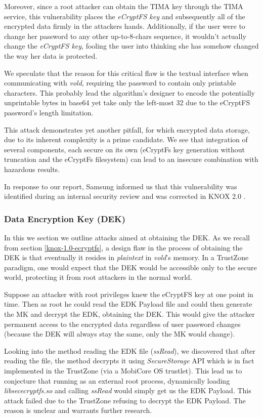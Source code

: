 \documentclass[11pt]{article}
\begin{document}
Moreover, since a root attacker can obtain the TIMA key through the TIMA service, this vulnerability places the \emph{eCryptFS key} and 
subsequently all of the encrypted data firmly in the attackers hands.
Additionally, if the user were to change her password to any other up-to-8-chars sequence, it wouldn't actually change the \emph{eCryptFS key}, 
fooling the user into thinking she has somehow changed the way her data is protected.

We speculate that the reason for this critical flaw is the textual interface when communicating with \emph{vold}, 
requiring the password to contain only printable characters. This probably lead the algorithm's designer to encode the potentially 
unprintable bytes in base64 yet take only the left-most 32 due to the eCryptFS password's length limitation.

This attack demonstrates yet another pitfall, for which encrypted data storage, due to its inherent complexity is a prime candidate. 
We see that integration of several components, each secure on its own (eCryptFs key generation without truncation and the eCryptFs filesystem) can lead 
to an insecure combination with hazardous results. 

In response to our report, Samsung informed us that this vulnerability was identified during an internal security review and was corrected in KNOX 2.0 \cite{SamsungCorrespondence}.

\subsubsection{Data Encryption Key (DEK)} \label{knox-1.0-dek-attack}
In this we section we outline attacks aimed at obtaining the DEK.
As we recall from section \ref{knox-1.0-ecryptfs}, a design flaw in the process of obtaining the DEK is that eventually it resides in \emph{plaintext} 
in \emph{vold}'s memory. In a TrustZone paradigm, one would expect that the DEK would be accessible only to the secure world, protecting it from 
root attackers in the normal world. 

Suppose an attacker with root privileges knew the eCryptFS key at one point in time. 
Then as root he could read the EDK Payload file and could then generate the MK and decrypt the EDK, obtaining the DEK. 
This would give the attacker permanent access to the encrypted data regardless of user password changes 
(because the DEK will always stay the same, only the MK would change).

Looking into the method reading the EDK file (\emph{ssRead}), we discovered that after reading the file, the method decrypts it using 
\emph{SecureStorage} API which is in fact implemented in the TrustZone (via a MobiCore OS trustlet).
This lead us to conjecture that running as an external root process, dynamically loading \emph{libsec\textunderscore ecryptfs.so} and calling \emph{ssRead} 
would simply get us the EDK Payload. This attack failed due to the TrustZone refusing to decrypt the EDK Payload. The reason is unclear and warrants 
further research.
\end{document}
